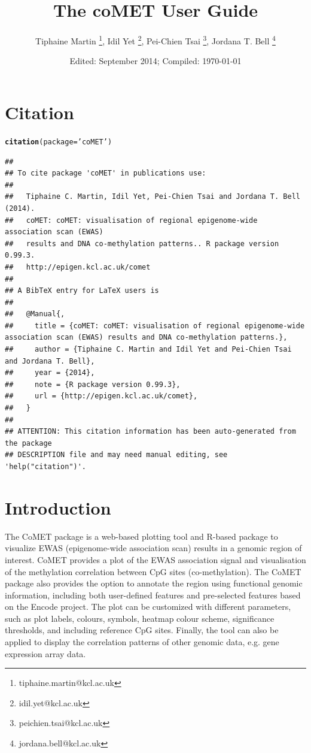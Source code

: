 \documentclass[11pt]{article}\usepackage[]{graphicx}\usepackage[usenames,dvipsnames]{color}
\title{The coMET User Guide}
\author{Tiphaine Martin \footnote{tiphaine.martin@kcl.ac.uk}, Idil Yet \footnote{idil.yet@kcl.ac.uk}, Pei-Chien Tsai \footnote{peichien.tsai@kcl.ac.uk}, Jordana T. Bell \footnote{jordana.bell@kcl.ac.uk}}
\date{Edited: September 2014; Compiled: \today}
\makeatletter
\newcommand{\hlstr}[1]{\textcolor[rgb]{0.192,0.494,0.8}{#1}}%
\newcommand{\hlstd}[1]{\textcolor[rgb]{0.345,0.345,0.345}{#1}}%
\newcommand{\hlkwc}[1]{\textcolor[rgb]{0.333,0.667,0.333}{#1}}%
\newcommand{\hlkwd}[1]{\textcolor[rgb]{0.737,0.353,0.396}{\textbf{#1}}}%
\newenvironment{kframe}{%
 \def\at@end@of@kframe{}%
 \ifinner\ifhmode%
  \def\at@end@of@kframe{\end{minipage}}%
  \begin{minipage}{\columnwidth}%
 \fi\fi%
 \def\FrameCommand##1{\hskip\@totalleftmargin \hskip-\fboxsep
 \colorbox{shadecolor}{##1}\hskip-\fboxsep
     \hskip-\linewidth \hskip-\@totalleftmargin \hskip\columnwidth}%
 \MakeFramed {\advance\hsize-\width
   \@totalleftmargin\z@ \linewidth\hsize
   \@setminipage}}%
 {\par\unskip\endMakeFramed%
 \at@end@of@kframe}
\newenvironment{knitrout}{}{} %
\makeatother
\begin{document}
\maketitle

\section{Citation}
\begin{knitrout}
\color{fgcolor}\begin{kframe}
\begin{alltt}
\hlkwd{citation}\hlstd{(}\hlkwc{package}\hlstd{=}\hlstr{'coMET'}\hlstd{)}
\end{alltt}
\begin{verbatim}
## 
## To cite package 'coMET' in publications use:
## 
##   Tiphaine C. Martin, Idil Yet, Pei-Chien Tsai and Jordana T. Bell (2014).
##   coMET: coMET: visualisation of regional epigenome-wide association scan (EWAS)
##   results and DNA co-methylation patterns.. R package version 0.99.3.
##   http://epigen.kcl.ac.uk/comet
## 
## A BibTeX entry for LaTeX users is
## 
##   @Manual{,
##     title = {coMET: coMET: visualisation of regional epigenome-wide association scan (EWAS) results and DNA co-methylation patterns.},
##     author = {Tiphaine C. Martin and Idil Yet and Pei-Chien Tsai and Jordana T. Bell},
##     year = {2014},
##     note = {R package version 0.99.3},
##     url = {http://epigen.kcl.ac.uk/comet},
##   }
## 
## ATTENTION: This citation information has been auto-generated from the package
## DESCRIPTION file and may need manual editing, see 'help("citation")'.
\end{verbatim}
\end{kframe}
\end{knitrout}

\clearpage

\tableofcontents
\clearpage

\section{Introduction}
The CoMET package is a web-based plotting tool and R-based package to visualize EWAS (epigenome-wide association scan) results in a genomic region of interest. CoMET provides a plot of the EWAS association signal and visualisation of the methylation correlation between CpG sites (co-methylation). The CoMET package also provides the option to annotate the region using functional genomic information, including both user-defined features and pre-selected features based on the Encode project. The plot can be customized with different parameters, such as plot labels, colours, symbols, heatmap colour scheme, significance thresholds, and including reference CpG sites. Finally, the tool can also be applied to display the correlation patterns of other genomic data, e.g. gene expression array data.
\end{document}
